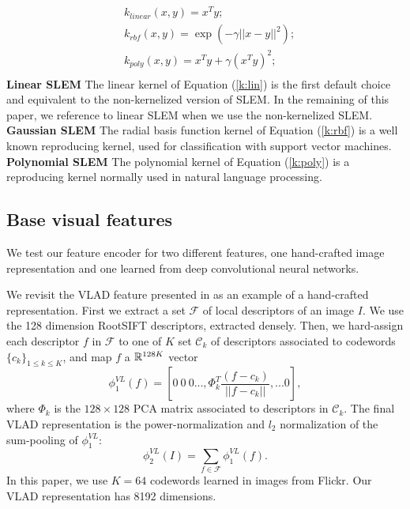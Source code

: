 \begin{align}
    &k_{linear}(x,y) = x^Ty; \label{k:lin}\\
    &k_{rbf}(x,y) = \exp(-\gamma|\! |x-y|\! |^2); \label{k:rbf}\\
    &k_{poly}(x,y) = x^Ty+\gamma(x^Ty)^2; \label{k:poly}\\
\end{align}
\textbf{Linear SLEM} The linear kernel of Equation (\ref{k:lin}) is the first default choice and equivalent to the non-kernelized version of SLEM.
In the remaining of this paper, we reference to linear SLEM when we use the non-kernelized SLEM.
\textbf{Gaussian SLEM} The radial basis function kernel of Equation (\ref{k:rbf}) is a
well known reproducing kernel, used for classification with support vector machines.
\textbf{Polynomial SLEM} The polynomial kernel of Equation (\ref{k:poly}) is a reproducing kernel normally used in natural language processing. 


\subsection{Base visual features}
We test our feature encoder for two different features, one hand-crafted image representation and one learned from deep convolutional neural networks.


We revisit the VLAD feature presented in \cite{VLAD} as an example of a hand-crafted representation. First we extract a set $\mathcal{F}$ of local descriptors of an image $I$. We use the 128 dimension RootSIFT \cite{3things} descriptors, extracted densely. 
Then, we hard-assign each descriptor $f$ in $\mathcal{F}$ to one of $K$ set $\mathcal{C}_k$ of descriptors associated to codewords $\{c_k\}_{1\leq k\leq K}$, and map $f$ a $\mathbb R^{128K}$ vector 
\begin{equation}
\phi^{VL}_1(f) = \left[0 \ 0 \ 0 ..., \Phi_k^T\frac{(f-c_k)}{||f-c_k||},... 0\right],
\end{equation}
where $\Phi_k$ is the $128\times 128$ PCA matrix associated to descriptors in $\mathcal{C}_k$. 
The final VLAD representation is the power-normalization and $l_2$ normalization of the sum-pooling of $\phi^{VL}_1$:
\begin{equation}
\phi^{VL}_2(I) = \sum_{f\in \mathcal{F}}\phi^{VL}_1(f).
\end{equation}
In this paper, we use $K=64$ codewords learned in images from Flickr. Our VLAD representation has 8192 dimensions.

